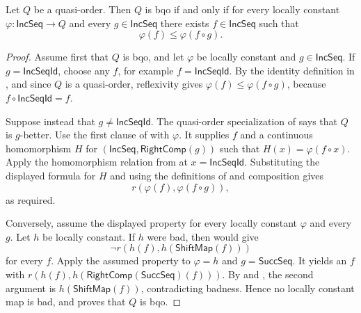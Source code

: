 \begin{corollary}
Let $Q$ be a quasi-order.  Then $Q$ is bqo if and only if for every
locally constant $\varphi:\mathsf{IncSeq}\to Q$ and every
$g\in\mathsf{IncSeq}$ there exists $f\in\mathsf{IncSeq}$ such that
\[
\varphi(f)\leq\varphi(f\circ g).
\]
\end{corollary}
\begin{proof}
Assume first that $Q$ is bqo, and let $\varphi$ be locally constant and
$g\in\mathsf{IncSeq}$.  If $g=\mathsf{IncSeqId}$, choose any $f$, for
example $f=\mathsf{IncSeqId}$.  By the identity definition in
, and since $Q$ is a quasi-order, reflexivity
gives $\varphi(f)\leq\varphi(f\circ g)$, because $f\circ
\mathsf{IncSeqId}=f$.

Suppose instead that $g\neq\mathsf{IncSeqId}$.  The quasi-order
specialization of  says that $Q$ is
$g$-better.  Use the first clause of  with
$\varphi$.  It supplies $f$ and a continuous homomorphism $H$ for
$(\mathsf{IncSeq},\mathsf{RightComp}(g))$ such that
$H(x)=\varphi(f\circ x)$.  Apply the homomorphism relation from
 at $x=\mathsf{IncSeqId}$.  Substituting the displayed
formula for $H$ and using the definitions of  and
composition gives
\[
 r(\varphi(f),\varphi(f\circ g)),
\]
as required.

Conversely, assume the displayed property for every locally constant
$\varphi$ and every $g$.  Let $h$ be locally constant.  If $h$ were bad,
then  would give
\[
\neg r(h(f),h(\mathsf{ShiftMap}(f)))
\]
for every $f$.  Apply the assumed property to $\varphi=h$ and
$g=\mathsf{SuccSeq}$.  It yields an $f$ with
$r(h(f),h(\mathsf{RightComp}(\mathsf{SuccSeq})(f)))$.  By
 and , the second argument is
$h(\mathsf{ShiftMap}(f))$,
contradicting badness.  Hence no locally constant map is bad, and
 proves that $Q$ is bqo.
\end{proof}
